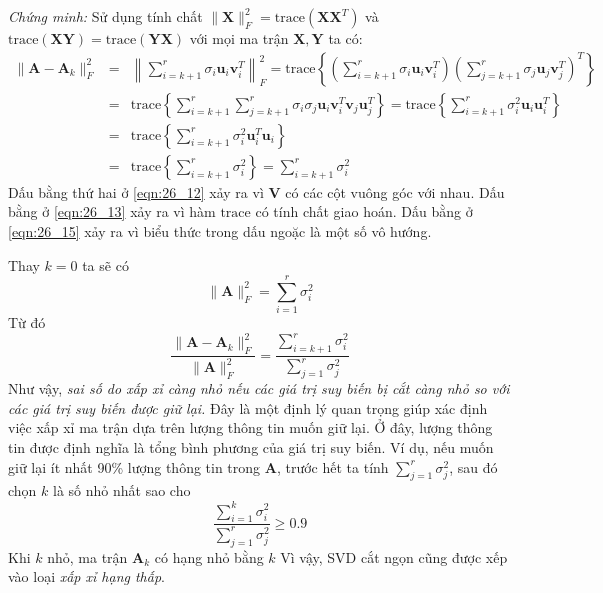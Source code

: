\textit{Chứng minh:} Sử dụng tính chất $\|\mathbf{X}\|_F^2 = \text{trace}(\mathbf{X}\mathbf{X}^T)$ và
$\text{trace}(\mathbf{XY}) = \text{trace}(\mathbf{YX})$ với mọi ma trận
$\mathbf{X, Y}$ ta có:
\begin{eqnarray} 
    \nonumber
    \|\mathbf{A} - \mathbf{A}_k\|_F^2 & = & \left\|\sum_{i = k + 1}^r \sigma_i
    \mathbf{u}_i\mathbf{v}_i^T \right\|_F^2   
     =  \text{trace}\left\{ \left(\sum_{i = k + 1}^r \sigma_i \mathbf{u}_i\mathbf{v}_i^T\right) 
    \left(\sum_{j = k + 1}^r \sigma_j \mathbf{u}_j\mathbf{v}_j^T\right)^T 
    \right\}  \\\ 
    \label{eqn:26_12}
    &=& \text{trace}\left\{ \sum_{i = k + 1}^r \sum_{j = k + 1}^r \sigma_i\sigma_j \mathbf{u}_i\mathbf{v}_i^T \mathbf{v}_j \mathbf{u}_j^T 
    \right\}  
    = \text{trace}\left\{ \sum_{i = k + 1}^r  \sigma_i^2\mathbf{u}_i\mathbf{u}_i^T 
    \right\} \\\ 
    \label{eqn:26_13}
    &=& \text{trace}\left\{ \sum_{i = k + 1}^r  \sigma_i^2\mathbf{u}_i^T\mathbf{u}_i 
    \right\}  \\\ 
    \label{eqn:26_15}
    &=& \text{trace}\left\{ \sum_{i = k + 1}^r  \sigma_i^2 
    \right\}  = \sum_{i = k + 1}^r \sigma_i^2  
\end{eqnarray} 
Dấu bằng thứ hai ở \eqref{eqn:26_12} xảy ra vì $\mathbf{V}$ có các cột vuông góc với nhau.
Dấu bằng ở \eqref{eqn:26_13} xảy ra vì hàm $\text{trace}$ có tính chất giao hoán. 
Dấu bằng ở \eqref{eqn:26_15} xảy ra vì biểu thức trong dấu ngoặc là một số vô hướng. \dpcm 
 
Thay $k = 0$ ta sẽ có
\begin{equation}
\label{eqn:26_16}
\|\mathbf{A}\|_F^2 = \sum_{i = 1}^r \sigma_i^2
\end{equation} 
Từ đó
\begin{equation} 
\label{eqn:26_17}
\frac{\|\mathbf{A} - \mathbf{A}_k\|_F^2}{\|\mathbf{A}\|_F^2} = {\frac{\sum_{i =
k + 1}^r \sigma_i^2}{\sum_{j = 1}^r \sigma_j^2}}
\end{equation} 
Như vậy, \textit{sai số do xấp xỉ càng nhỏ nếu các giá trị suy biến bị
cắt càng nhỏ so với các giá trị suy biến được giữ lại.}
Đây là một định lý quan trọng giúp xác định việc xấp xỉ ma trận dựa trên lượng
thông tin muốn giữ lại. Ở đây, {lượng thông tin} được định nghĩa
là tổng bình phương của giá trị suy biến. Ví dụ, nếu muốn giữ lại ít nhất
90\% lượng thông tin trong $\mathbf{A}$, trước hết ta tính $\sum_{j = 1}^r
\sigma_j^2$, sau đó chọn $k$ là số nhỏ nhất sao cho
\begin{equation} 
\frac{\sum_{i = 1}^k \sigma_i^2}{\sum_{j = 1}^r \sigma_j^2} \geq 0.9 
\end{equation} 
Khi $k$ nhỏ, ma trận $\mathbf{A}_k$ có hạng nhỏ bằng $k$
Vì vậy, SVD cắt ngọn cũng được xếp vào loại \textit{xấp xỉ hạng thấp}.
 
